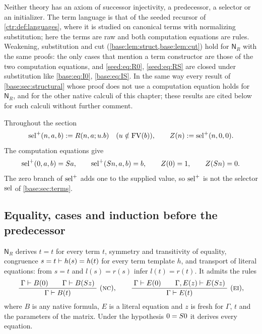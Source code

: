 Neither theory has an axiom of successor injectivity, a predecessor, a
selector or an initializer. The term language is that of the seeded recursor
of \cref{ctr:def:languages}, where it is studied on canonical terms with
normalizing substitution; here the terms are raw and both computation
equations are rules. Weakening, substitution and cut
(\cref{base:lem:struct,base:lem:cut}) hold for $\mathsf{N}_R$ with the same
proofs: the only cases that mention a term constructor are those of the two
computation equations, and \eqref{seed:eq:R0}, \eqref{seed:eq:RS} are closed
under substitution like \eqref{base:eq:I0}, \eqref{base:eq:IS}. In the same
way every result of \cref{base:sec:structural} whose proof does not use a
computation equation holds for $\mathsf{N}_R$, and for the other native
calculi of this chapter; these results are cited below for such calculi
without further comment.

Throughout the section
\[
 \operatorname{sel}^{+}(n,a,b)\mathrel{:=} R(n,a;u.b)\quad(u\notin\operatorname{FV}(b)),\qquad
 Z(n)\mathrel{:=}\operatorname{sel}^{+}(n,0,0).
\]
The computation equations give
\begin{equation}\label{seed:eq:selplus}
 \operatorname{sel}^{+}(0,a,b)=S a,\qquad \operatorname{sel}^{+}(S n,a,b)=b,\qquad
 Z(0)=1,\qquad Z(S n)=0 .
\end{equation}
The zero branch of $\operatorname{sel}^{+}$ adds one to the supplied value, so $\operatorname{sel}^{+}$
is not the selector $\operatorname{sel}$ of \cref{base:sec:terms}.

\subsection{Equality, cases and induction before the predecessor}

\begin{lemma}\label{seed:lem:succ-basic}
$\mathsf{N}_R$ derives $t=t$ for every term $t$, symmetry and transitivity of
equality, congruence $s=t\vdash h(s)=h(t)$ for every term template $h$, and
transport of literal equations: from $s=t$ and $l(s)=r(s)$ infer
$l(t)=r(t)$. It admits the rules
\[
 \dfrac{\;\Gamma\vdash B(0)\qquad\Gamma\vdash B(S z)\;}{\;\Gamma\vdash B(t)\;}
 \ (\textsc{nc}),\qquad
 \dfrac{\;\Gamma\vdash E(0)\qquad\Gamma,E(z)\vdash E(S z)\;}{\;\Gamma\vdash E(t)\;}\ (\textsc{ei}),
\]
where $B$ is any native formula, $E$ is a literal equation and $z$ is fresh
for $\Gamma$, $t$ and the parameters of the matrix. Under the hypothesis
$0=S 0$ it derives every equation.
\end{lemma}

